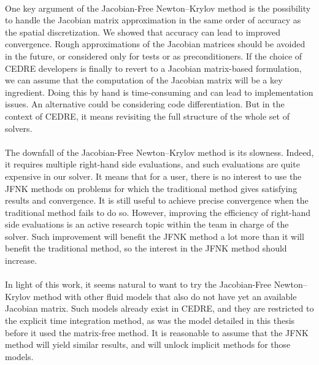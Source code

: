     \paragraph{}
    One key argument of the Jacobian-Free Newton--Krylov method is the possibility to handle the Jacobian matrix approximation in the same order of accuracy as the spatial discretization.
    We showed that accuracy can lead to improved convergence.
    Rough approximations of the Jacobian matrices should be avoided in the future, or considered only for tests or as preconditioners.
    If the choice of CEDRE developers is finally to revert to a Jacobian matrix-based formulation, we can assume that the computation of the Jacobian matrix will be a key ingredient.
    Doing this by hand is time-consuming and can lead to implementation issues.
    An alternative could be considering code differentiation.
    But in the context of CEDRE, it means revisiting the full structure of the whole set of solvers.

    \paragraph{}
    The downfall of the Jacobian-Free Newton--Krylov method is its slowness.
    Indeed, it requires multiple right-hand side evaluations, and such evaluations are quite expensive in our solver.
    It means that for a user, there is no interest to use the JFNK methods on problems for which the traditional method gives satisfying results and convergence.
    It is still useful to achieve precise convergence when the traditional method fails to do so.
    However, improving the efficiency of right-hand side evaluations is an active research topic within the team in charge of the solver.
    Such improvement will benefit the JFNK method a lot more than it will benefit the traditional method, so the interest in the JFNK method should increase.

    \paragraph{}
    In light of this work, it seems natural to want to try the Jacobian-Free Newton--Krylov method with other fluid models that also do not have yet an available Jacobian matrix.
    Such models already exist in CEDRE, and they are restricted to the explicit time integration method, as was the model detailed in this thesis before it used the matrix-free method.
    It is reasonable to assume that the JFNK method will yield similar results, and will unlock implicit methods for those models.

